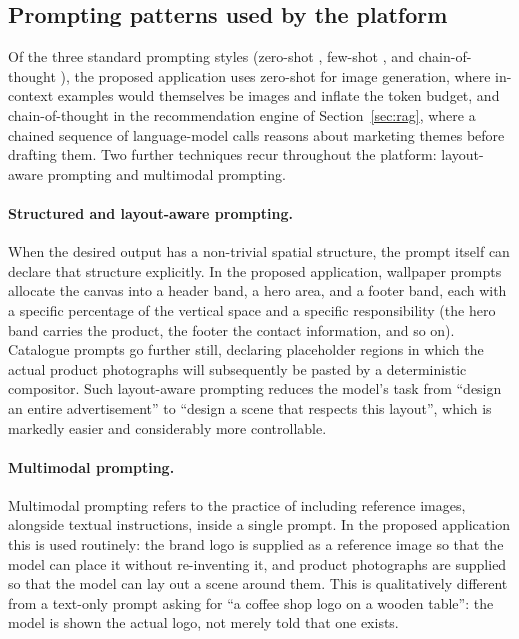 \subsection{Prompting patterns used by the platform}

Of the three standard prompting styles (zero-shot \cite{kojima2022zeroshot}, few-shot \cite{brown2020gpt3}, and chain-of-thought \cite{wei2022cot}), the proposed application uses zero-shot for image generation, where in-context examples would themselves be images and inflate the token budget, and chain-of-thought in the recommendation engine of Section~\ref{sec:rag}, where a chained sequence of language-model calls reasons about marketing themes before drafting them. Two further techniques recur throughout the platform: layout-aware prompting and multimodal prompting.

\paragraph{Structured and layout-aware prompting.}
When the desired output has a non-trivial spatial structure, the prompt itself can declare that structure explicitly. In the proposed application, wallpaper prompts allocate the canvas into a header band, a hero area, and a footer band, each with a specific percentage of the vertical space and a specific responsibility (the hero band carries the product, the footer the contact information, and so on). Catalogue prompts go further still, declaring placeholder regions in which the actual product photographs will subsequently be pasted by a deterministic compositor. Such layout-aware prompting reduces the model's task from ``design an entire advertisement'' to ``design a scene that respects this layout'', which is markedly easier and considerably more controllable.

\paragraph{Multimodal prompting.}
Multimodal prompting refers to the practice of including reference images, alongside textual instructions, inside a single prompt. In the proposed application this is used routinely: the brand logo is supplied as a reference image so that the model can place it without re-inventing it, and product photographs are supplied so that the model can lay out a scene around them. This is qualitatively different from a text-only prompt asking for ``a coffee shop logo on a wooden table'': the model is shown the actual logo, not merely told that one exists.


